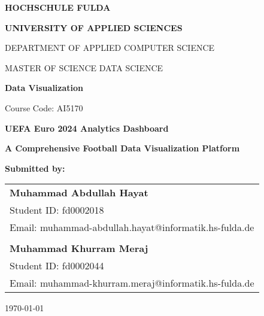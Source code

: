 \documentclass[12pt,a4paper]{article}
\begin{document}
\begin{titlepage}
    \centering
    
    \vspace*{1cm}
    

    {\Large \textbf{HOCHSCHULE FULDA} \par}
    {\large \textbf{UNIVERSITY OF APPLIED SCIENCES} \par}
    \vspace{0.5cm}
    
    {\large DEPARTMENT OF APPLIED COMPUTER SCIENCE \par}
    {\large MASTER OF SCIENCE DATA SCIENCE \par}
    \vspace{2cm}
    
    {\Large \textbf{Data Visualization} \par}
    {\large Course Code: AI5170 \par}
    \vspace{2cm}
    
    {\Huge \textbf{UEFA Euro 2024 Analytics Dashboard} \par}
    \vspace{0.5cm}
    {\LARGE \textbf{A Comprehensive Football Data Visualization Platform} \par}
    \vspace{3cm}
    
    {\large \textbf{Submitted by:} \par}
    \vspace{0.5cm}
    
    \begin{tabular}{l}
        \textbf{Muhammad Abdullah Hayat} \\
        Student ID: fd0002018 \\
        Email: muhammad-abdullah.hayat@informatik.hs-fulda.de \\
        \\
        \textbf{Muhammad Khurram Meraj} \\
        Student ID: fd0002044 \\
        Email: muhammad-khurram.meraj@informatik.hs-fulda.de \\
    \end{tabular}
    
    \vfill
    
    {\large \today \par}
    
\end{titlepage}
\end{document}
